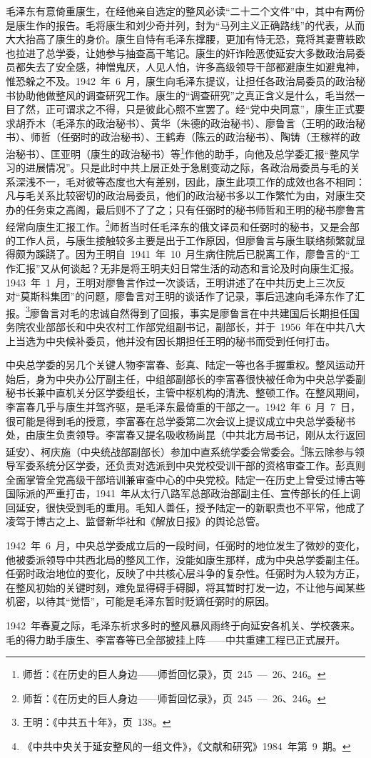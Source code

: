 毛泽东有意倚重康生，在经他亲自选定的整风必读“二十二个文件”中，其中有两份是康生作的报告。毛将康生和刘少奇并列，封为“马列主义正确路线”的代表，从而大大抬高了康生的身价。康生自恃有毛泽东撑腰，更加有恃无恐，竟将其妻曹轶欧也拉进了总学委，让她参与抽查高干笔记。康生的奸诈险恶使延安大多数政治局委员都失去了安全感，神憎鬼厌，人见人怕，许多高级领导干部都避康生如避鬼神，惟恐躲之不及。1942~年~6~月，康生向毛泽东提议，让担任各政治局委员的政治秘书协助他做整风的调查研究工作。康生的“调查研究”之真正含义是什么，毛当然一目了然，正可谓求之不得，只是彼此心照不宣罢了。经“党中央同意”，康生正式要求胡乔木（毛泽东的政治秘书）、黄华（朱德的政治秘书）、廖鲁言（王明的政治秘书）、师哲（任弼时的政治秘书）、王鹤寿（陈云的政治秘书）、陶铸（王稼祥的政治秘书）、匡亚明（康生的政治秘书）等\footnote{师哲：《在历史的巨人身边——师哲回忆录》，页~245~—~26、246。}作他的助手，向他及总学委汇报“整风学习的进展情况”。只是此时中共上层正处于急剧变动之际，各政治局委员与毛的关系深浅不一，毛对彼等态度也大有差别，因此，康生此项工作的成效也各不相同：凡与毛关系比较密切的政治局委员，他们的政治秘书多以工作繁忙为由，对康生交办的任务束之高阁，最后则不了了之；只有任弼时的秘书师哲和王明的秘书廖鲁言经常向康生汇报工作。\footnote{师哲：《在历史的巨人身边——师哲回忆录》，页~245~—~26、246。}师哲当时任毛泽东的俄文译员和任弼时的秘书，又是会部的工作人员，与康生接触较多主要是出于工作原因，但廖鲁言与康生联络频繁就显得颇为蹊跷了。因为王明自~1941~年~10~月生病住院后已脱离工作，廖鲁言的“工作汇报”又从何谈起？无非是将王明夫妇日常生活的动态和言论及时向康生汇报。1943~年~1~月，王明对廖鲁言作过一次谈话，王明讲述了在中共历史上三次反对“莫斯科集团”的问题，廖鲁言对王明的谈话作了记录，事后迅速向毛泽东作了汇报。\footnote{王明：《中共五十年》，页~138。}廖鲁言对毛的忠诚自然得到了回报，事实是廖鲁言在中共建国后长期担任国务院农业部部长和中央农村工作部党组副书记，副部长，并于~1956~年在中共八大上当选为中央候补委员，他并没有因长期担任王明的秘书而受到任何打击。

中央总学委的另几个关键人物李富春、彭真、陆定一等也各手握重权。整风运动开始后，身为中央办公厅副主任，中组部副部长的李富春很快被任命为中央总学委副秘书长兼中直机关分区学委组长，主管中枢机构的清洗、整顿工作。在整风期间，李富春几乎与康生并驾齐驱，是毛泽东最倚重的干部之一。1942~年~6~月~7~日，很可能是得到毛的授意，李富春在总学委第二次会议上提议成立中央总学委秘书处，由康生负责领导。李富春又提名吸收杨尚昆（中共北方局书记，刚从太行返回延安）、柯庆施（中央统战部副部长）参加中直系统学委会常委会。\footnote{《中共中央关于延安整风的一组文件》，《文献和研究》1984~年第~9~期。}陈云除参与领导军委系统分区学委，还负责对选派到中央党校受训干部的资格审查工作。彭真则全面掌管全党高级干部培训兼审查中心的中央党校。陆定一在历史上曾受过博古等国际派的严重打击，1941~年从太行八路军总部政治部副主任、宣传部长的任上调回延安，很快受到毛的重用。毛知人善任，授予陆定一的新职责也不平常，他成了凌驾于博古之上、监督新华社和《解放日报》的舆论总管。

1942~年~6~月，中央总学委成立后的一段时间，任弼时的地位发生了微妙的变化，他被委派领导中共西北局的整风工作，没能如康生那样，成为中央总学委副主任。任弼时政治地位的变化，反映了中共核心层斗争的复杂性。任弼时为人较为方正，在整风初始的关键时刻，难免显得碍手碍脚，将其暂时打发一边，不让他与闻某些机密，以待其“觉悟”，可能是毛泽东暂时贬谪任弼时的原因。

1942~年春夏之际，毛泽东祈求多时的整风暴风雨终于向延安各机关、学校袭来。毛的得力助手康生、李富春等已全部披挂上阵——中共重建工程已正式展开。